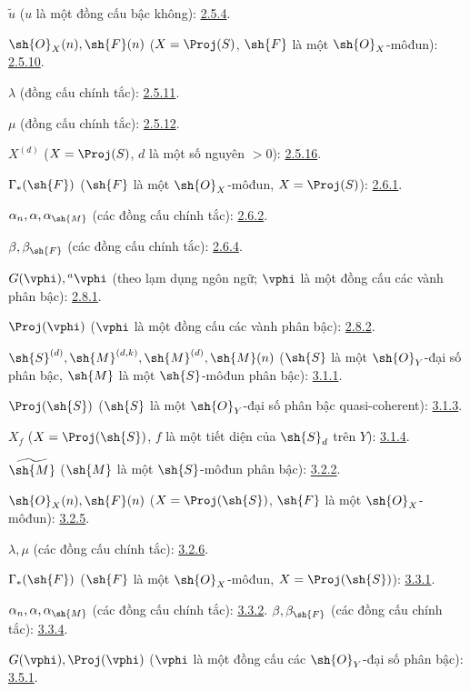 \documentclass[oneside,10pt]{amsart}
\newcommand{\oldpage}[2][]{\marginnote{\normalfont\footnotesize\textbf{#1}~|~#2}\ignorespaces}
\begin{document}
$\widetilde u$ ($u$ là một đồng cấu bậc không): \hyperref[II.2.5.4]{2.5.4}.

$\sh{O}_X(n),\sh{F}(n)$
($X=\Proj(S)$, $\sh{F}$ là một $\sh{O}_X$-môđun): \hyperref[II.2.5.10]{2.5.10}.

$\lambda$ (đồng cấu chính tắc): \hyperref[II.2.5.11]{2.5.11}.

$\mu$ (đồng cấu chính tắc): \hyperref[II.2.5.12]{2.5.12}.

$X^{(d)}$ ($X=\Proj(S)$, $d$ là một số nguyên $>0$): \hyperref[II.2.5.16]{2.5.16}.

$\Gamma_*(\sh{F})$ ($\sh{F}$ là một $\sh{O}_X$-môđun,
$X=\Proj(S)$): \hyperref[II.2.6.1]{2.6.1}.

$\alpha_n,\alpha,\alpha_{\sh{M}}$ (các đồng cấu chính tắc): \hyperref[II.2.6.2]{2.6.2}.

$\beta,\beta_{\sh{F}}$ (các đồng cấu chính tắc): \hyperref[II.2.6.4]{2.6.4}.

$G(\vphi),{}^a\vphi$ (theo lạm dụng ngôn ngữ;
$\vphi$ là một đồng cấu các vành phân bậc): \hyperref[II.2.8.1]{2.8.1}.

$\Proj(\vphi)$ ($\vphi$ là một đồng cấu các vành phân bậc): \hyperref[II.2.8.2]{2.8.2}.

$\sh{S}^{(d)},\sh{M}^{(d,k)},\sh{M}^{(d)},\sh{M}(n)$
($\sh{S}$ là một $\sh{O}_Y$-đại số phân bậc,
$\sh{M}$ là một $\sh{S}$-môđun phân bậc): \hyperref[II.3.1.1]{3.1.1}.

$\Proj(\sh{S})$ ($\sh{S}$ là một $\sh{O}_Y$-đại số phân bậc quasi-coherent): \hyperref[II.3.1.3]{3.1.3}.

$X_f$ ($X=\Proj(\sh{S})$, $f$ là một tiết diện của $\sh{S}_d$ trên $Y$): \hyperref[II.3.1.4]{3.1.4}.

$\widetilde{\sh{M}}$ ($\sh{M}$ là một $\sh{S}$-môđun phân bậc): \hyperref[II.3.2.2]{3.2.2}.

$\sh{O}_X(n),\sh{F}(n)$
($X=\Proj(\sh{S})$, $\sh{F}$ là một $\sh{O}_X$-môđun): \hyperref[II.3.2.5]{3.2.5}.

$\lambda,\mu$ (các đồng cấu chính tắc): \hyperref[II.3.2.6]{3.2.6}.

$\Gamma_*(\sh{F})$ ($\sh{F}$ là một $\sh{O}_X$-môđun,
$X=\Proj(\sh{S})$): \hyperref[II.3.3.1]{3.3.1}.

$\alpha_n,\alpha,\alpha_{\sh{M}}$ (các đồng cấu chính tắc): \hyperref[II.3.3.2]{3.3.2}.
\oldpage[II]{208}
$\beta,\beta_{\sh{F}}$ (các đồng cấu chính tắc): \hyperref[II.3.3.4]{3.3.4}.

$G(\vphi),\Proj(\vphi)$
($\vphi$ là một đồng cấu các $\sh{O}_Y$-đại số phân bậc): \hyperref[II.3.5.1]{3.5.1}.
\end{document}
